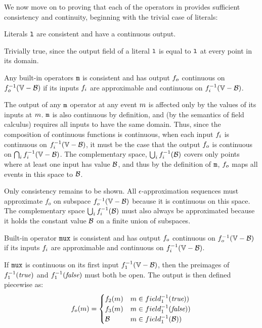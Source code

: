 \documentclass[12pt,a4paper,twoside,openright]{book}
\begin{document}
\begin{appendices}
We now move on to proving that each of the operators in \calculus{} provides sufficient consistency and continuity, beginning with the trivial case of literals:
\begin{lem}\label{thm:lit}
  Literals $\texttt{l}$ are consistent and have a continuous output. 
\end{lem}
  Trivially true, since the output field of a literal $\texttt{l}$ is equal to $\texttt{l}$ at every point in its domain.

\begin{lem}\label{thm:math}
  Any built-in operators $\texttt{m}$ is consistent and has output $f_o$ continuous on $\validdomain{\field_o}$ if its inputs $f_i$ are approximable and continuous on $\validdomain{\field_i}$.
\end{lem}
  The output of any $\texttt{m}$ operator at any event $m$ is affected only by the values of its inputs at $m$.  $\texttt{m}$ is also continuous by definition, and (by the semantics of field calculus) requires all inputs to have the same domain.
  Thus, since the composition of continuous functions is continuous, when each input $f_i$ is continuous on $\validdomain{\field_i}$, it must be the case that the output $f_o$ is continuous on $\bigcap_i \validdomain{\field_i}$.
  The complementary space, $\bigcup_i f_i^{-1}(\mathcal{B})$ covers only points where at least one input has value $\mathcal{B}$, and thus by the definition of $\texttt{m}$, $f_o$ maps all events in this space to $\mathcal{B}$.

  Only consistency remains to be shown.  All $\epsilon$-approximation sequences must approximate $f_o$ on subspace $\validdomain{\field_o}$ because it is continuous on this space.
  The complementary space $\bigcup_i f_i^{-1}(\mathcal{B})$ must also always be approximated because it holds the constant value $\mathcal{B}$ on a finite union of subspaces.

\begin{lem}\label{thm:mux}
  Built-in operator $\texttt{mux}$ is consistent and has output $f_o$ continuous on $\validdomain{\field_o}$ if its inputs $f_i$ are approximable and continuous on $\validdomain{\field_i}$.
\end{lem}
  If $\texttt{mux}$ is continuous on its first input $\validdomain{\field_1}$, then the preimages of $f_1^{-1}(\textit{true})$ and $f_1^{-1}(\textit{false})$ must both be open.  The output is then defined piecewise as:
  $$f_o(m) = \begin{cases}
    f_2(m) & m \in field_1^{-1}(\textit{true})) \\
    f_3(m) & m \in field_1^{-1}(\textit{false})) \\
    \mathcal{B} & m \in field_1^{-1}(\mathcal{B})) \\
  \end{cases}$$ 


\end{appendices}
\end{document}
